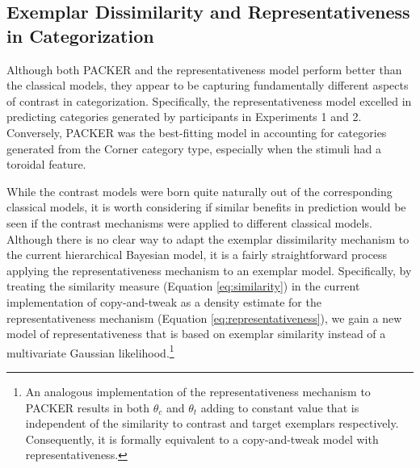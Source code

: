 \documentclass[12pt]{article}
\begin{document}
\begin{flushleft}
\subsection{Exemplar Dissimilarity and Representativeness in Categorization} 
Although both PACKER and the representativeness model perform better than the
classical models, they appear to be capturing fundamentally different aspects of
contrast in categorization. Specifically, the representativeness model excelled
in predicting categories generated by participants in Experiments 1 and 2.
Conversely, PACKER was the best-fitting model in accounting for categories
generated from the Corner category type, especially when the stimuli had a
toroidal feature.


While the contrast models were born quite naturally out of the corresponding
classical models, it is worth considering if similar benefits in prediction
would be seen if the contrast mechanisms were applied to different classical
models. Although there is no clear way to adapt the exemplar dissimilarity
mechanism to the current hierarchical Bayesian model, it is a fairly
straightforward process applying the representativeness mechanism to an exemplar
model. Specifically, by treating the similarity measure (Equation
\ref{eq:similarity}) in the current implementation of copy-and-tweak as a
density estimate for the representativeness mechanism (Equation
\ref{eq:representativeness}), we gain a new model of representativeness that is
based on exemplar similarity instead of a multivariate Gaussian
likelihood.\footnote{An analogous implementation of the representativeness
  mechanism to PACKER results in both $\theta_c$ and $\theta_t$ adding to
  constant value that is independent of the similarity to contrast and target
  exemplars respectively. Consequently, it is formally equivalent to a
  copy-and-tweak model with representativeness.}


\end{flushleft}
\end{document}
